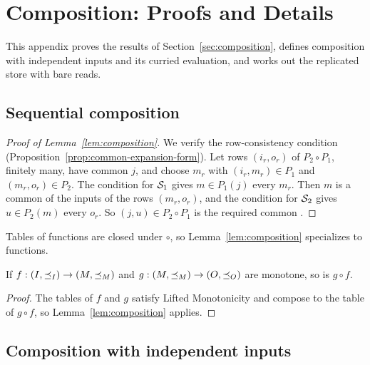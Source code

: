 \section{Composition: Proofs and Details}
\label{app:composition}

This appendix proves the results of Section~\ref{sec:composition}, defines
composition with independent inputs and its curried evaluation, and works out
the replicated store with bare reads.

\subsection{Sequential composition}

\begin{proof}[Proof of Lemma~\ref{lem:composition}]
We verify the row-consistency condition
(Proposition~\ref{prop:common-expansion-form}).  Let rows $(i_r,o_r)$ of
$P_2\circ P_1$, finitely many, have common \indesc $j$, and choose $m_r$ with
$(i_r,m_r)\in P_1$ and $(m_r,o_r)\in P_2$.  The condition for $\mathcal{S}_1$ gives
$m\in P_1(j)$ \outrelpart every $m_r$.  Then $m$ is a common \indesc of the
inputs of the rows $(m_r,o_r)$, and the condition for $\mathcal{S}_2$ gives
$u\in P_2(m)$ \outrelpart every $o_r$.  So $(j,u)\in P_2\circ P_1$ is the
required common \outnoun.
\end{proof}

Tables of functions are closed under $\circ$, so Lemma~\ref{lem:composition}
specializes to functions.

\begin{corollary}
\label{cor:functional-composition}
If $f:(I,\preceq_I)\to(M,\preceq_M)$ and
$g:(M,\preceq_M)\to(O,\preceq_O)$ are monotone, so is $g\circ f$.
\end{corollary}

\begin{proof}
The tables of $f$ and $g$ satisfy Lifted Monotonicity and compose to the
table of $g\circ f$, so Lemma~\ref{lem:composition} applies.
\end{proof}

\subsection{Composition with independent inputs}
\label{sec:parameterized-composition}

